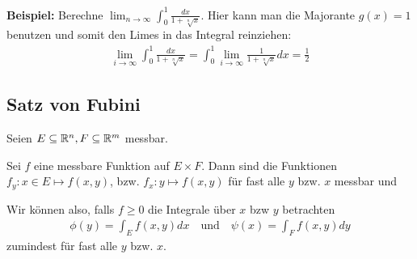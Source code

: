 \textbf{Beispiel:} Berechne $\lim_{n \to \infty} \int_0^1 \frac{dx}{1 + \sqrt[n]{x}}$. Hier kann man die Majorante $g(x) = 1$ benutzen und somit den Limes in das Integral reinziehen:
\begin{align*}
	\lim_{i \to \infty} \int_0^1 \frac{dx}{1 + \sqrt[n]x} = \int_0^1 \lim_{i \to \infty} \frac{1}{1 + \sqrt[n]x}dx = \frac{1}{2}
\end{align*}

\subsection{Satz von Fubini}

Seien $E \subseteq \mathbb{R}^n, F \subseteq \mathbb{R}^m$ messbar.

\begin{lemma}[]
Sei $f$ eine messbare Funktion auf $E \times F$.
Dann sind die Funktionen $f_y: x \in E \mapsto f(x,y)$, bzw. $f_x: y \mapsto f(x,y)$ für fast alle $y$ bzw. $x$ messbar und
\end{lemma}


Wir können also, falls $f \geq 0$ die Integrale über $x$ bzw $y$ betrachten
\begin{align*}
	\phi(y) = \int_E f(x,y) dx \quad \text{und} \quad \psi(x) = \int_F f(x,y) dy
\end{align*}
zumindest für fast alle $y$ bzw. $x$.\\
